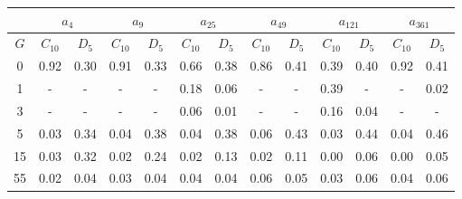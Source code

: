 \begin{table}[h]
   \begin{center}
        \begin{tabular}{c|c|c|c|c|c|c|c|c|c|c|c|c}
            \toprule
            & \multicolumn{2}{c|}{$a_{4}$} & \multicolumn{2}{c|}{$a_{9}$} & \multicolumn{2}{c|}{$a_{25}$} & \multicolumn{2}{c|}{$a_{49}$} & \multicolumn{2}{c|}{$a_{121}$} & \multicolumn{2}{c}{$a_{361}$} \\
            \midrule
            $G$ & $C_{10}$ & $D_{5}$ & $C_{10}$ & $D_{5}$ & $C_{10}$ & $D_{5}$ & $C_{10}$ & $D_{5}$ & $C_{10}$ & $D_{5}$ & $C_{10}$ & $D_{5}$ \\
            \midrule
            0 & 0.92 & 0.30 & 0.91 & 0.33 & 0.66 & 0.38 & 0.86 & 0.41 & 0.39 & 0.40 & 0.92 & 0.41 \\
            1 & - & - & - & - & 0.18 & 0.06 & - & - & 0.39 & - & - & 0.02 \\
            3 & - & - & - & - & 0.06 & 0.01 & - & - & 0.16 & 0.04 & - & - \\
            5 & 0.03 & 0.34 & 0.04 & 0.38 & 0.04 & 0.38 & 0.06 & 0.43 & 0.03 & 0.44 & 0.04 & 0.46 \\
            15 & 0.03 & 0.32 & 0.02 & 0.24 & 0.02 & 0.13 & 0.02 & 0.11 & 0.00 & 0.06 & 0.00 & 0.05 \\
            55 & 0.02 & 0.04 & 0.03 & 0.04 & 0.04 & 0.04 & 0.06 & 0.05 & 0.03 & 0.06 & 0.04 & 0.06 \\
            \bottomrule
        \end{tabular}
   \end{center}
\end{table}
